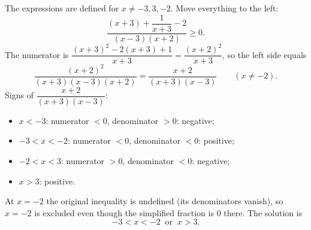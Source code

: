 The expressions are defined for $x\ne-3,3,-2$. Move everything to the left:
\[
\dfrac{(x+3)+\dfrac{1}{x+3}-2}{(x-3)(x+2)}\ge0 .
\]
The numerator is $\dfrac{(x+3)^2-2(x+3)+1}{x+3}=\dfrac{(x+2)^2}{x+3}$, so the left side equals
\[
\dfrac{(x+2)^2}{(x+3)(x-3)(x+2)}=\dfrac{x+2}{(x+3)(x-3)}\qquad(x\ne-2).
\]
Signs of $\dfrac{x+2}{(x+3)(x-3)}$:
\begin{itemize}
\item $x<-3$: numerator $<0$, denominator $>0$: negative;
\item $-3<x<-2$: numerator $<0$, denominator $<0$: positive;
\item $-2<x<3$: numerator $>0$, denominator $<0$: negative;
\item $x>3$: positive.
\end{itemize}
At $x=-2$ the original inequality is undefined (its denominators vanish), so $x=-2$ is excluded even though the simplified fraction is $0$ there. The solution is
\[
\boxed{-3<x<-2\ \text{ or }\ x>3}.
\]
